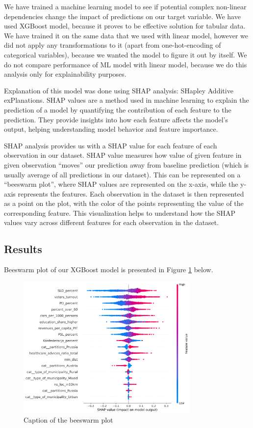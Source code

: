 \documentclass[a4paper,12pt]{article} %
\begin{document}
We have trained a machine learning model to see if potential complex non-linear dependencies change the impact of predictions on our target variable. We have used XGBoost model, because it proves to be effective solution for tabular data. \cite{10.1145/2939672.2939785} We have trained it on the same data that we used with linear model, however we did not apply any transformations to it (apart from one-hot-encoding of categorical variables), because we wanted the model to figure it out by itself. We do not compare performance of ML model with linear model, because we do this analysis only for explainability purposes. 

Explanation of this model was done using SHAP analysis: SHapley Additive exPlanations. SHAP values are a method used in machine learning to explain the prediction of a model by quantifying the contribution of each feature to the prediction. They provide insights into how each feature affects the model's output, helping understanding model behavior and feature importance. \cite{Lundberg2017AUA}

SHAP analysis provides us with a SHAP value for each feature of each observation in our dataset. SHAP value measures how value of given feature in given observation “moves” our prediction away from baseline prediction (which is usually average of all predictions in our dataset). This can be represented on a “beeswarm plot”, where SHAP values are represented on the x-axis, while the y-axis represents the features. Each observation in the dataset is then represented as a point on the plot, with the color of the points representing the value of the corresponding feature. This visualization helps to understand how the SHAP values vary across different features for each observation in the dataset.


\newpage
\subsection{Results}
Beeswarm plot of our XGBoost model is presented in Figure \ref{fig:beeswarm} below.
\begin{figure}[htbp]
    \centering
    \includegraphics[width=0.8\textwidth]{assets/beeswarm.png}
    \caption{Caption of the beeswarm plot}
    \label{fig:beeswarm}
  \end{figure}
\end{document}
